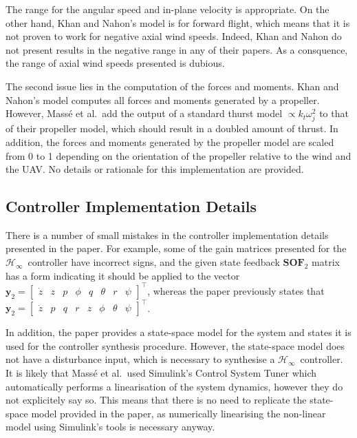 \documentclass[a4paper,12pt]{article}
\newcommand{\hinf}{\mathcal{H}_\infty}
\newcommand{\Hinf}{\(\hinf\)}
\begin{document}
            The range for the angular speed and in-plane velocity is appropriate. On the other hand, Khan and Nahon's model is for forward flight, which means that it is not proven to work for negative axial wind speeds. Indeed, Khan and Nahon do not present results in the negative range in any of their papers. As a consquence, the range of axial wind speeds presented is dubious.

            The second issue lies in the computation of the forces and moments. Khan and Nahon's model computes all forces and moments generated by a propeller. However, Mass{\'e} et al.\ add the output of a standard thurst model \(\propto k_t \omega_j^2\) to that of their propeller model, which should result in a doubled amount of thrust. In addition, the forces and moments generated by the propeller model are scaled from 0 to 1 depending on the orientation of the propeller relative to the wind and the UAV. No details or rationale for this implementation are provided.

        \subsection{Controller Implementation Details}
        
            There is a number of small mistakes in the controller implementation details presented in the paper. For example, some of the gain matrices presented for the \Hinf\ controller have incorrect signs, and the given state feedback \(\mathbf{SOF}_2\) matrix has a form indicating it should be applied to the vector \(\mathbf{y}_2 = \begin{bmatrix} \dot{z} & z & p & \phi & q & \theta & r & \psi \end{bmatrix}^\top\), whereas the paper previously states that \(\mathbf{y}_2 = \begin{bmatrix} \dot{z} & p & q & r & z & \phi & \theta & \psi \end{bmatrix}^\top\).

            In addition, the paper provides a state-space model for the system and states it is used for the controller synthesis procedure. However, the state-space model does not have a disturbance input, which is necessary to synthesise a \Hinf\ controller. It is likely that Mass{\'e} et al.\ used Simulink's Control System Tuner which automatically performs a linearisation of the system dynamics, however they do not explicitely say so. This means that there is no need to replicate the state-space model provided in the paper, as numerically linearising the non-linear model using Simulink's tools is necessary anyway.
\end{document}
